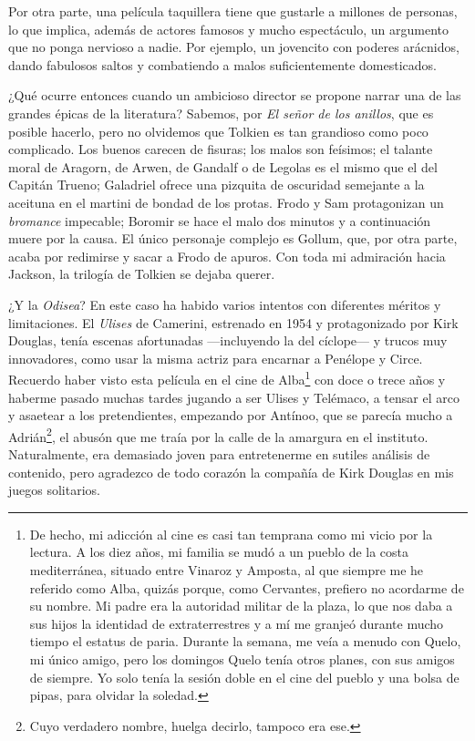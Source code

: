 Por otra parte, una película taquillera tiene que gustarle a millones de personas, lo que implica, además de actores famosos y mucho espectáculo, un argumento que no ponga nervioso a nadie. Por ejemplo, un jovencito con poderes arácnidos, dando fabulosos saltos y combatiendo a malos suficientemente domesticados.

¿Qué ocurre entonces cuando un ambicioso director se propone narrar una de las grandes épicas de la literatura? Sabemos, por \emph{El señor de los anillos}, que es posible hacerlo, pero no olvidemos que Tolkien es tan grandioso como poco complicado. Los buenos carecen de fisuras; los malos son feísimos; el talante moral de Aragorn, de Arwen, de Gandalf o de Legolas es el mismo que el del Capitán Trueno; Galadriel ofrece una pizquita de oscuridad semejante a la aceituna en el martini de bondad de los protas. Frodo y Sam protagonizan un \emph{bromance} impecable; Boromir se hace el malo dos minutos y a continuación muere por la causa. El único personaje complejo es Gollum, que, por otra parte, acaba por redimirse y sacar a Frodo de apuros. Con toda mi admiración hacia Jackson, la trilogía de Tolkien se dejaba querer.

¿Y la \emph{Odisea}? En este caso ha habido varios intentos con diferentes méritos y limitaciones. El \emph{Ulises} de Camerini, estrenado en 1954 y protagonizado por Kirk Douglas, tenía escenas afortunadas ---incluyendo la del cíclope--- y trucos muy innovadores, como usar la misma actriz para encarnar a Penélope y Circe. Recuerdo haber visto esta película en el cine de Alba\footnote{De hecho, mi adicción al cine es casi tan temprana como mi vicio por la lectura. A los diez años, mi familia se mudó a un pueblo de la costa mediterránea, situado entre Vinaroz y Amposta, al que siempre me he referido como Alba, quizás porque, como Cervantes, prefiero no acordarme de su nombre. Mi padre era la autoridad militar de la plaza, lo que nos daba a sus hijos la identidad de extraterrestres y a mí me granjeó durante mucho tiempo el estatus de paria. Durante la semana, me veía a menudo con Quelo, mi único amigo, pero los domingos Quelo tenía otros planes, con sus amigos de siempre. Yo solo tenía la sesión doble en el cine del pueblo y una bolsa de pipas, para olvidar la soledad.} con doce o trece años y haberme pasado muchas tardes jugando a ser Ulises y Telémaco, a tensar el arco y asaetear a los pretendientes, empezando por Antínoo, que se parecía mucho a Adrián\footnote{Cuyo verdadero nombre, huelga decirlo, tampoco era ese.}, el abusón que me traía por la calle de la amargura en el instituto. Naturalmente, era demasiado joven para entretenerme en sutiles análisis de contenido, pero agradezco de todo corazón la compañía de Kirk Douglas en mis juegos solitarios.

